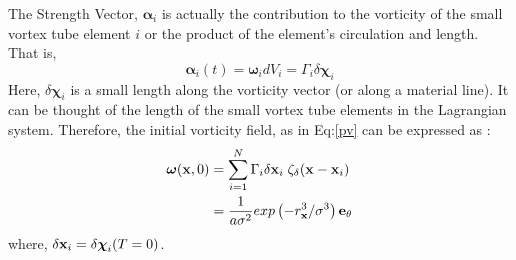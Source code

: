 \documentclass[10pt,a4paper]{report}
\newcommand{\omegav}{{\boldsymbol \omega}}
\newcommand{\xv}{{\bf x}}
\newcommand{\et}{{\bf e}_\theta}
\newcommand{\alphav}{{\boldsymbol \alpha}}
\newcommand{\chiv}{{\boldsymbol \chi}}
\begin{document}
The Strength Vector, $ \alphav_i $ is actually the contribution to the vorticity of the small vortex tube element $i$ or the product of the element's circulation and length. That is,
\begin{equation}
\alphav_i (t) = \omegav_i dV_i = \Gamma_i \delta \chiv_i
\end{equation} 
Here, $\delta \chiv_i $ is a small length along the vorticity vector (or along a material line). It can be thought of the length of the small vortex tube elements in the Lagrangian system. Therefore, the initial vorticity field, as in Eq:\ref{pv} can be expressed as :
\begin{align}
\omegav(\xv, 0) &= \sum_{i=1}^N \Gamma_i \delta \xv_i \; \zeta_\delta( \xv - \xv_i) \\
				&= \frac{1}{a\sigma^2} exp\left(-r_\xv^3/\sigma^3\right) \et
\end{align}
where, $ \delta \xv_i = \delta \chiv_i(T = 0) $.
\end{document}
